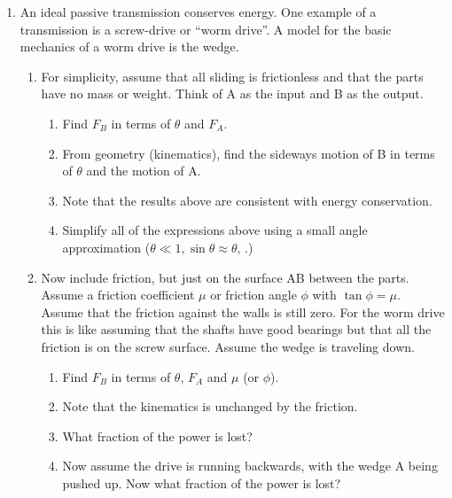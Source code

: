 \begin{enumerate}

\item  An ideal passive transmission conserves energy.
One example of a transmission is a screw-drive or ``worm drive''.   A model for the basic
mechanics of a worm drive is the wedge.

\begin{enumerate}

\item  For simplicity, assume that all sliding is frictionless and that
the parts have no mass or weight.  Think of A as the input and B as
the output. 

\begin{enumerate}

\item   Find $F_B$ in terms of $\theta$ and $F_A$.

\item From geometry (kinematics), find the sideways motion
of B in terms of $\theta$ and the motion of A.

\item Note that the results above are consistent with energy conservation.

\item Simplify all of the expressions above using a small angle approximation
($\theta \ll 1, \sin \theta \approx \theta$, \etc.)

\end{enumerate}

\item Now include friction, but just on the surface AB between the parts.  Assume a friction coefficient $\mu$ or friction angle $\phi$ with $\tan\phi = \mu$.  Assume that the
friction against the walls is still zero.  For the worm drive this is like assuming
that the shafts have good bearings but that all the friction is on the screw
surface.  Assume the wedge is traveling down. 

\begin{enumerate}
\item  Find $F_B$ in terms of $\theta$,  $F_A$ and $\mu$  (or $\phi$).
\item  Note that the kinematics is unchanged by the friction.
\item  What fraction of the power is lost?
\item  Now assume the drive is running backwards, with the wedge A
 being pushed up.  Now what fraction of the power is lost?
 

\end{enumerate}
\end{enumerate}
\end{enumerate}
